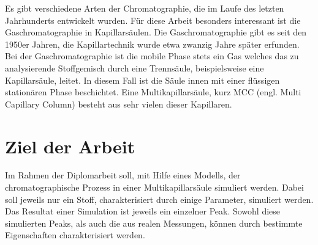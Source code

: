 
% 
% 
  

Es gibt verschiedene Arten der Chromatographie, die im Laufe des letzten Jahrhunderts entwickelt wurden. Für diese Arbeit besonders interessant ist die Gaschromatographie in Kapillarsäulen. Die Gaschromatographie gibt es seit den 1950er Jahren, die Kapillartechnik wurde etwa zwanzig Jahre später erfunden.
Bei der Gaschromatographie ist die mobile Phase stets ein Gas welches das zu analysierende Stoffgemisch durch eine Trennsäule, beispielsweise eine Kapillarsäule, leitet. In diesem Fall ist die Säule innen mit einer flüssigen stationären Phase beschichtet. Eine Multikapillarsäule, kurz MCC (engl. Multi Capillary Column) besteht aus sehr vielen dieser Kapillaren.




\section{Ziel der Arbeit}

Im Rahmen der Diplomarbeit soll, mit Hilfe eines Modells, der chromatographische Prozess in einer Multikapillarsäule simuliert werden. 
Dabei soll jeweils nur ein Stoff, charakterisiert durch einige Parameter, simuliert werden. Das Resultat einer Simulation ist jeweils ein einzelner Peak. Sowohl diese simulierten Peaks, als auch die aus realen Messungen, können durch bestimmte Eigenschaften charakterisiert werden. 

